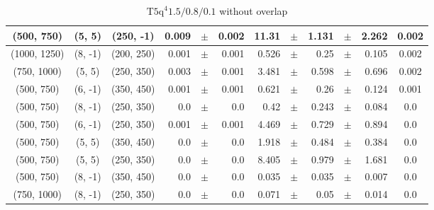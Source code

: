 \documentclass[12pt]{paper}
\newcommand{\TFiveqqqqHL}{\ensuremath{\textrm{T5q}^{4} 1.5/0.8/0.1}\xspace}
\begin{document}
\begin{table}[ht]
\begin{center}
{\begin{tabular}{|c|c|c|rrr|rrrrr|c|}
(500, 750)&(5, 5)&(250, -1)&0.009&$\pm$&0.002&11.31&$\pm$&1.131&$\pm$&2.262&0.002\\\hline
(1000, 1250)&(8, -1)&(200, 250)&0.001&$\pm$&0.001&0.526&$\pm$&0.25&$\pm$&0.105&0.002\\\hline
(750, 1000)&(5, 5)&(250, 350)&0.003&$\pm$&0.001&3.481&$\pm$&0.598&$\pm$&0.696&0.002\\\hline
(500, 750)&(6, -1)&(350, 450)&0.001&$\pm$&0.001&0.621&$\pm$&0.26&$\pm$&0.124&0.001\\\hline
(500, 750)&(8, -1)&(250, 350)&0.0&$\pm$&0.0&0.42&$\pm$&0.243&$\pm$&0.084&0.0\\\hline
(500, 750)&(6, -1)&(250, 350)&0.001&$\pm$&0.001&4.469&$\pm$&0.729&$\pm$&0.894&0.0\\\hline
(500, 750)&(5, 5)&(350, 450)&0.0&$\pm$&0.0&1.918&$\pm$&0.484&$\pm$&0.384&0.0\\\hline
(500, 750)&(5, 5)&(250, 350)&0.0&$\pm$&0.0&8.405&$\pm$&0.979&$\pm$&1.681&0.0\\\hline
(500, 750)&(8, -1)&(350, 450)&0.0&$\pm$&0.0&0.035&$\pm$&0.035&$\pm$&0.007&0.0\\\hline
(750, 1000)&(8, -1)&(250, 350)&0.0&$\pm$&0.0&0.071&$\pm$&0.05&$\pm$&0.014&0.0\\\hline
\end{tabular}}\end{center}\caption{\TFiveqqqqHL without overlap}\end{table}
\end{document}

